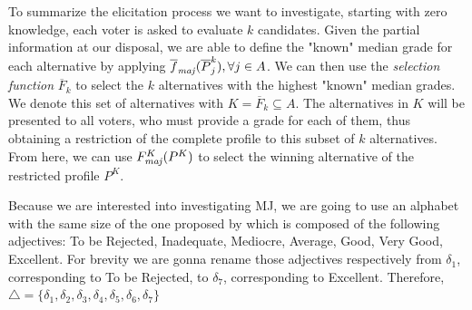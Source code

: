 To summarize the elicitation process we want to investigate, starting with zero knowledge, each voter is asked to evaluate $k$ candidates. Given the partial information at our disposal, we are able to define the "known" median grade for each alternative by applying $\fmajbar(\Pbar^k_{j}), \forall j\in A$. We can then use the \emph{selection function} $\overline{F}_k$ to select the $k$ alternatives with the highest "known" median grades. We denote this set of alternatives with $K=\overline{F}_k\subseteq A$. The alternatives in $K$ will be presented to all voters, who must provide a grade for each of them, thus obtaining a restriction of the complete profile to this subset of $k$ alternatives. From here, we can use $\Fmaj[K](P^K)$ to select the winning alternative of the restricted profile $P^K$.

%
%
%

\begin{remark}
	Because we are interested into investigating \acs{MJ}, we are going to use an alphabet with the same size of the one proposed by \citet{Balinski2011} which is composed of the following adjectives: To be Rejected, Inadequate, Mediocre, Average, Good, Very Good, Excellent. For brevity we are gonna rename those adjectives respectively from $\delta_1$, corresponding to To be Rejected, to $\delta_7$, corresponding to Excellent. Therefore, $\triangle=\{\delta_1,\delta_2, \delta_3,\delta_4,\delta_5,\delta_6,\delta_7\}$ 
\end{remark}

